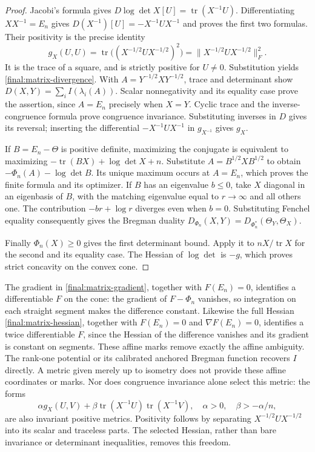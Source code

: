 \begin{proof}
Jacobi's formula gives $D\log\det X[U]=\operatorname{tr}(X^{-1}U)$.
Differentiating $XX^{-1}=E_n$ gives
$D(X^{-1})[U]=-X^{-1}UX^{-1}$ and proves the first two formulas.
Their positivity is the precise identity
\[
 g_X(U,U)=\operatorname{tr}
    \bigl((X^{-1/2}UX^{-1/2})^2\bigr)
          =\|X^{-1/2}UX^{-1/2}\|_F^2.
\]
It is the trace of a square, and is strictly positive for $U\ne0$.
Substitution yields \eqref{final:matrix-divergence}.  With
$A=Y^{-1/2}XY^{-1/2}$, trace and determinant show
$D(X,Y)=\sum_i I(\lambda_i(A))$.  Scalar nonnegativity and its equality
case prove the assertion, since $A=E_n$ precisely when $X=Y$.
Cyclic trace and the inverse-congruence formula prove congruence
invariance.  Substituting inverses in $D$ gives its reversal; inserting
the differential $-X^{-1}UX^{-1}$ in $g_{X^{-1}}$ gives $g_X$.

If $B=E_n-\Theta$ is positive definite, maximizing the conjugate is
equivalent to maximizing $-\operatorname{tr}(BX)+\log\det X+n$.
Substitute $A=B^{1/2}XB^{1/2}$ to obtain
$-\Phi_n(A)-\log\det B$.  Its unique maximum occurs at $A=E_n$,
which proves the finite formula and its optimizer.  If $B$ has an
eigenvalue $b\leq0$, take $X$ diagonal in an eigenbasis of $B$, with
the matching eigenvalue equal to $r\to\infty$ and all others one.
The contribution $-br+\log r$ diverges even when $b=0$.
Substituting Fenchel equality consequently gives the Bregman duality
$D_{\Phi_n}(X,Y)=D_{\Phi_n^*}(\Theta_Y,\Theta_X)$.

Finally $\Phi_n(X)\geq0$ gives the first determinant bound.  Apply
it to $nX/\operatorname{tr}X$ for the second and its equality case.
The Hessian of $\log\det$ is $-g$, which proves strict concavity on
the convex cone.
\end{proof}

The gradient in \eqref{final:matrix-gradient}, together with
$F(E_n)=0$, identifies a differentiable $F$ on the cone: the gradient
of $F-\Phi_n$ vanishes, so integration on each straight segment makes
the difference constant.  Likewise the full Hessian
\eqref{final:matrix-hessian}, together with $F(E_n)=0$ and
$\nabla F(E_n)=0$, identifies a twice differentiable $F$, since the
Hessian of the difference vanishes and its gradient is constant on
segments.  These affine marks remove exactly the affine ambiguity.
The rank-one potential or its calibrated anchored Bregman function
recovers $I$ directly.  A metric given merely up to isometry does not
provide these affine coordinates or marks.  Nor does congruence
invariance alone select this metric: the forms
\[
 \alpha g_X(U,V)+\beta\operatorname{tr}(X^{-1}U)
                             \operatorname{tr}(X^{-1}V),
 \quad \alpha>0,\quad\beta>-\alpha/n,
\]
are also invariant positive metrics.  Positivity follows by separating
$X^{-1/2}UX^{-1/2}$ into its scalar and traceless parts.  The selected
Hessian, rather than bare invariance or determinant inequalities,
removes this freedom.

